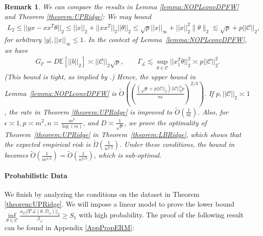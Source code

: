 \documentclass{article}
\newtheorem{remark}{\textbf{Remark}}
\begin{document}
\begin{remark}
\label{remark:compare_dist_free_ACCFW}
We can compare the results in Lemma \ref{lemma:NOPLconvDPFW} and Theorem \ref{theorem:UPRidge}: We may bound
\begin{align*}
L_2 \leq ||yx - xx^T\theta||_2 \leq ||x||_2 + ||xx^T||_2||\theta||_2 \le \sqrt{p}||x||_\infty + ||x||_2^2 \|\theta\|_2  \lesssim \sqrt{p} + p||\mathcal{C}||_2,
\end{align*}
for arbitrary $|y|, ||x||_\infty \leq 1$.
In the context of Lemma~\ref{lemma:NOPLconvDPFW}, we have
\begin{align*}
G_{\mathcal{C}} = D\mathbb{E}\left[||b||_2\right] \asymp ||\mathcal{C}||_2\sqrt{p}, \qquad
\Gamma_{\mathcal{L}} \lesssim \mathop{\sup}\limits_{\theta \in \mathcal{C}}||x_1^T\theta||_2^2 \asymp p||\mathcal{C}||_2^2.
\end{align*}
(This bound is tight, as implied by \cite{NOPL}.) Hence, the upper bound in Lemma~\ref{lemma:NOPLconvDPFW} is $\widetilde{O}\left(\left(\frac{(\sqrt{p} + p||\mathcal{C}||_2)||\mathcal{C}||_2^2p}{n\epsilon}\right)^{2/3}\right)$. If $p, ||\mathcal{C}||_2 \asymp 1$, the rate in Theorem \ref{theorem:UPRidge} is improved to $\widetilde{O}\left(\frac{1}{n\epsilon}\right)$. Also, for $\epsilon \asymp 1, p \asymp m^2, n \asymp \frac{m^3}{\log(m)}$, and $D \asymp \frac{1}{\sqrt{p}}$, we prove the optimality of Theorem~\ref{theorem:UPRidge} in Theorem~\ref{theorem:LBRidge}, which shows that the expected empirical risk is $\widetilde{\Omega}\left(\frac{1}{n^{2/3}}\right)$. Under these conditions, the bound in
\cite{NOPL} becomes $\widetilde{O}\left(\frac{1}{m^{4/3}}\right) = \widetilde{O}\left(\frac{1}{n^{4/9}}\right)$, which is sub-optimal.
\end{remark}


\paragraph{Probabilistic Data}

We finish by analyzing the conditions on the dataset in Theorem \ref{theorem:UPRidge}. We will impose a linear model to prove the lower bound $\mathop{\inf}\limits_{\theta \in \mathcal{C}}\frac{\alpha_{\mathcal{C}}||\nabla \mathcal{L}(\theta, \mathcal{D}_n)||_2}{\beta_{\mathcal{L}}} \ge S_1$ with high probability. The proof of the following result can be found in Appendix \ref{AppPropERM}:
\end{document}
